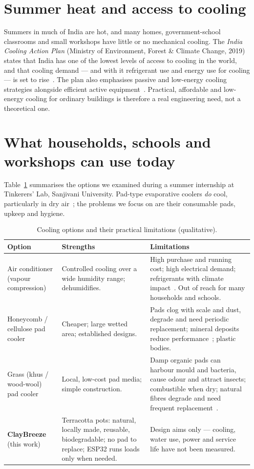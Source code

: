 \documentclass[11pt,a4paper]{report}
\begin{document}
\section{Summer heat and access to cooling}
Summers in much of India are hot, and many homes, government-school classrooms and small workshops have little or no mechanical cooling. The \emph{India Cooling Action Plan} (Ministry of Environment, Forest \& Climate Change, 2019) states that India has one of the lowest levels of access to cooling in the world, and that cooling demand --- and with it refrigerant use and energy use for cooling --- is set to rise~\cite{icap}. The plan also emphasises passive and low-energy cooling strategies alongside efficient active equipment~\cite{icap}. Practical, affordable and low-energy cooling for ordinary buildings is therefore a real engineering need, not a theoretical one.

\section{What households, schools and workshops can use today}
Table~\ref{tab:options} summarises the options we examined during a summer internship at Tinkerers' Lab, Sanjivani University. Pad-type evaporative coolers \emph{do} cool, particularly in dry air~\cite{watson}; the problems we focus on are their consumable pads, upkeep and hygiene.

\begin{table}[H]
\centering
\caption{Cooling options and their practical limitations (qualitative).}
\label{tab:options}
\small
\begin{tabularx}{\linewidth}{@{}>{\raggedright\arraybackslash}p{3.2cm}>{\raggedright\arraybackslash}X>{\raggedright\arraybackslash}X@{}}
\toprule
\textbf{Option} & \textbf{Strengths} & \textbf{Limitations} \\
\midrule
Air conditioner (vapour compression) & Controlled cooling over a wide humidity range; dehumidifies. & High purchase and running cost; high electrical demand; refrigerants with climate impact~\cite{epa,energystar,icap}. Out of reach for many households and schools. \\
Honeycomb / cellulose pad cooler & Cheaper; large wetted area; established designs. & Pads clog with scale and dust, degrade and need periodic replacement; mineral deposits reduce performance~\cite{watson,doe}; plastic bodies. \\
Grass (khus / wood-wool) pad cooler & Local, low-cost pad media; simple construction. & Damp organic pads can harbour mould and bacteria, cause odour and attract insects; combustible when dry; natural fibres degrade and need frequent replacement~\cite{alsulaiman,jain}. \\
\textbf{ClayBreeze} (this work) & Terracotta pots: natural, locally made, reusable, biodegradable; no pad to replace; ESP32 runs loads only when needed. & Design aims only --- cooling, water use, power and service life have not been measured. \\
\bottomrule
\end{tabularx}
\end{table}
\end{document}

